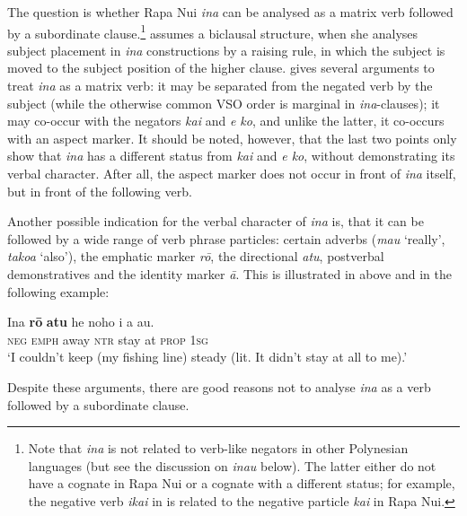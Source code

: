 The question is whether Rapa Nui \textit{{\ꞌ}ina} can be analysed as a matrix verb followed by a subordinate clause.\footnote{\label{fn:494}Note that \textit{{\ꞌ}ina} is not related to verb-like negators in other Polynesian languages (but see the discussion on  \textit{inau} below). The latter either do not have a cognate in Rapa Nui or a cognate with a different status; for example, the negative verb \textit{{\ꞌ}ikai} in  is related to the negative particle \textit{kai} in Rapa Nui.} \citet[57]{WeberN2003} assumes a biclausal structure, when she analyses subject placement in \textit{{\ꞌ}ina} constructions by a raising rule, in which the subject is moved to the subject position of the higher clause. \citet[159–160]{Stenson1981} gives several arguments to treat \textit{{\ꞌ}ina} as a matrix verb: it may be separated from the negated verb by the subject (while the otherwise common VSO order is marginal in \textit{{\ꞌ}ina}-clauses); it may co-occur with the negators \textit{kai} and \textit{e ko}, and unlike the latter, it co-occurs with an aspect marker. It should be noted, however, that the last two points only show that \textit{{\ꞌ}ina} has a different status from \textit{kai} and \textit{e ko}, without demonstrating its verbal character. After all, the aspect marker does not occur in front of \textit{{\ꞌ}ina} itself, but in front of the following verb.

Another possible indication for the verbal character of \textit{{\ꞌ}ina} is, that it can be followed by a wide range of verb phrase particles: certain adverbs (\textit{mau} ‘really’, \textit{\mbox{tako{\ꞌ}a}} ‘also’), the emphatic marker \textit{rō}, the directional \textit{atu}, postverbal demonstratives and the identity marker \textit{{\ꞌ}ā}. This is illustrated in  above and in the following example:

\ea\label{ex:10.113}
\gll {\ꞌ}Ina \textbf{rō} \textbf{atu} he noho i a au. \\
\textsc{neg} \textsc{emph} away \textsc{ntr} stay at \textsc{prop} \textsc{1sg} \\

\glt 
‘I couldn’t keep (my fishing line) steady (lit. It didn’t stay at all to me).’ \textstyleExampleref{[R230.162]} 
\z

Despite these arguments, there are good reasons not to analyse \textit{{\ꞌ}ina} as a verb followed by a subordinate clause. 

